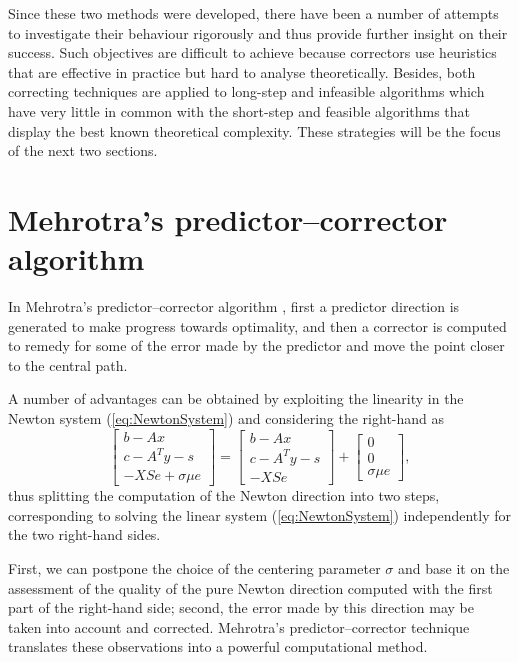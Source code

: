 Since these two methods were developed, there have been a number of 
attempts to investigate their behaviour rigorously and thus provide
further insight on their success. 
Such objectives are difficult to achieve because 
correctors use heuristics that are effective in practice but hard 
to analyse theoretically. 
Besides, both correcting techniques are applied to long-step and infeasible 
algorithms which have very little in common with the short-step and 
feasible algorithms that display the best known theoretical complexity.
These strategies will be the focus of the next two sections.


%
%
\section{Mehrotra's predictor--corrector algorithm}
\label{sec:MehrotraPC}

In Mehrotra's predictor--corrector algorithm \cite{Mehrotra92}, 
first a predictor direction is generated 
to make progress towards optimality, and then 
a corrector is computed to remedy for some of the error made by the predictor
and move the point closer to the central path.

A number of advantages can be obtained by exploiting the
linearity in the Newton system (\ref{eq:NewtonSystem}) and
considering the right-hand as
\[
 \left[ 
  \begin{array}{c}
    b-Ax \\ c-A^Ty-s \\ -XSe + \sigma\mu e
  \end{array} \right]
 = \left[ 
  \begin{array}{c}
    b-Ax \\ c-A^Ty-s \\ -XSe
  \end{array} \right]
 + \left[ 
  \begin{array}{c}
    0 \\ 0 \\ \sigma\mu e
  \end{array} \right],
\]
thus splitting the computation 
of the Newton direction into two steps, corresponding to solving the linear
system (\ref{eq:NewtonSystem}) independently for the two right-hand 
sides. 

First, we can postpone the choice of the centering parameter 
$\sigma$ and base it on the assessment of the quality of the 
pure Newton direction computed with the first part of the right-hand side;
second, the error made by this direction may be 
taken into account and
corrected. Mehrotra's predictor--corrector technique \cite{Mehrotra92}
translates these observations into a powerful computational method.

